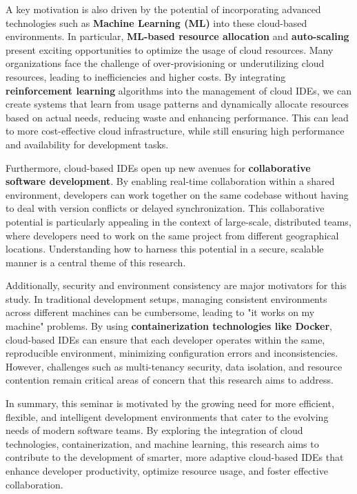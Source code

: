 \documentclass[12pt,a4paper,final]{report}
\begin{document}
A key motivation is also driven by the potential of incorporating advanced technologies such as \textbf{Machine Learning (ML)} into these cloud-based environments. In particular, \textbf{ML-based resource allocation} and \textbf{auto-scaling} present exciting opportunities to optimize the usage of cloud resources. Many organizations face the challenge of over-provisioning or underutilizing cloud resources, leading to inefficiencies and higher costs. By integrating \textbf{reinforcement learning} algorithms into the management of cloud IDEs, we can create systems that learn from usage patterns and dynamically allocate resources based on actual needs, reducing waste and enhancing performance. This can lead to more cost-effective cloud infrastructure, while still ensuring high performance and availability for development tasks.

Furthermore, cloud-based IDEs open up new avenues for \textbf{collaborative software development}. By enabling real-time collaboration within a shared environment, developers can work together on the same codebase without having to deal with version conflicts or delayed synchronization. This collaborative potential is particularly appealing in the context of large-scale, distributed teams, where developers need to work on the same project from different geographical locations. Understanding how to harness this potential in a secure, scalable manner is a central theme of this research.

Additionally, security and environment consistency are major motivators for this study. In traditional development setups, managing consistent environments across different machines can be cumbersome, leading to "it works on my machine" problems. By using \textbf{containerization technologies like Docker}, cloud-based IDEs can ensure that each developer operates within the same, reproducible environment, minimizing configuration errors and inconsistencies. However, challenges such as multi-tenancy security, data isolation, and resource contention remain critical areas of concern that this research aims to address.

In summary, this seminar is motivated by the growing need for more efficient, flexible, and intelligent development environments that cater to the evolving needs of modern software teams. By exploring the integration of cloud technologies, containerization, and machine learning, this research aims to contribute to the development of smarter, more adaptive cloud-based IDEs that enhance developer productivity, optimize resource usage, and foster effective collaboration.
\end{document}
